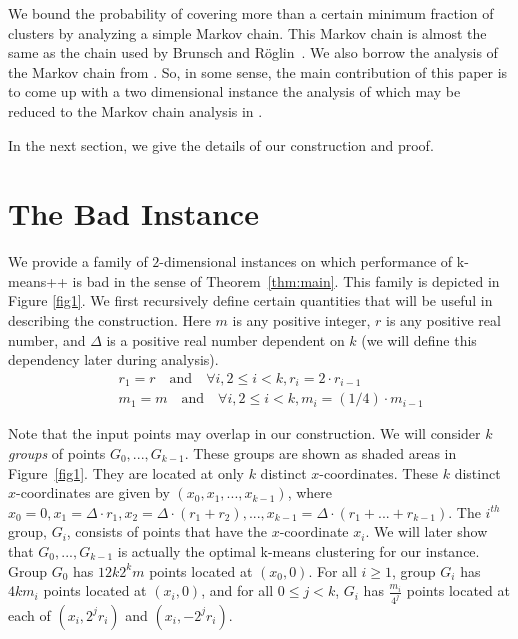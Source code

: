 \documentclass[11pt]{article}
\begin{document}
We bound the probability of covering more than a certain minimum fraction of clusters by analyzing a simple Markov chain. This Markov chain is almost the same as the chain used by Brunsch and R\"{o}glin~\cite{br12}. 
We also borrow the analysis of the Markov chain from \cite{br12}.
So, in some sense, the main contribution of this paper is to come up with a two dimensional instance the analysis of which may be reduced to the Markov chain analysis in \cite{br12}.

In the next section, we give the details of our construction and proof.


\section{The Bad Instance} 

We provide a family of $2$-dimensional instances on which performance of k-means++ is bad in the sense of Theorem~\ref{thm:main}. 
This family is depicted in Figure \ref{fig1}. 
We first recursively define certain quantities that will be useful in describing the construction. 
Here $m$ is any positive integer, $r$ is any positive real number, and $\Delta$ is a positive real number dependent on $k$ (we will define this dependency later during analysis).
\begin{eqnarray*}
&& r_1 = r \quad \textrm{and} \quad \forall i, 2 \leq i < k, r_i = 2 \cdot r_{i-1} \\
&& m_1 = m \quad \textrm{and} \quad \forall i, 2 \leq i < k, m_i =  (1/4) \cdot m_{i-1}
\end{eqnarray*}

Note that the input points may overlap in our construction.
We will consider $k$ {\em groups} of points $G_0, ..., G_{k-1}$.
These groups are shown as shaded areas in Figure~\ref{fig1}.
They are located at only $k$ distinct $x$-coordinates.
These $k$ distinct $x$-coordinates are given by $(x_0, x_1, ..., x_{k-1})$, where 
$x_0 = 0, x_1 = \Delta \cdot r_1, x_2 = \Delta \cdot (r_1 + r_2), ..., x_{k-1} = \Delta \cdot (r_1 + ... + r_{k-1})$.
The $i^{th}$ group, $G_i$, consists of points that have the $x$-coordinate $x_i$.
We will later show that $G_0, ..., G_{k-1}$ is actually the optimal k-means clustering for our instance.
Group $G_0$ has $12 k 2^k m$ points located at $(x_0, 0)$. 
For all $i \geq 1$, group $G_i$ has $4km_i$ points located at $(x_i, 0)$, and for all $0 \leq j < k$, $G_i$ has $\frac{m_i}{4^j}$ points located at each of $\left(x_i, 2^j r_i \right)$ and $\left(x_i, - 2^j r_i \right)$.
\end{document}
